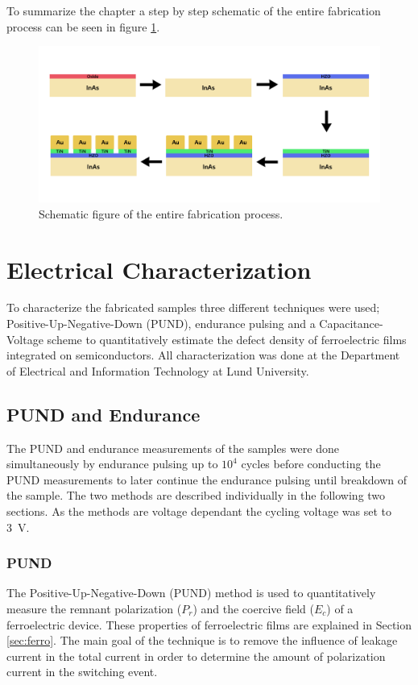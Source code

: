 \documentclass[11pt,twoside]{eitExjobb}
\begin{document}
To summarize the chapter a step by step schematic of the entire fabrication
process can be seen in figure \ref{fig:fab_done}.

\begin{figure}[htbp]
    \centering
    \includegraphics[width=.80\linewidth]{fig/fabproc/fab_done.png}
    \caption{Schematic figure of the entire fabrication process.}\label{fig:fab_done}
\end{figure}

\chapter{Electrical Characterization}\label{ch:char}

To characterize the fabricated samples three different techniques were used;
Positive-Up-Negative-Down (PUND), endurance pulsing and a Capacitance-Voltage scheme to
quantitatively estimate the defect density of ferroelectric films integrated on
semiconductors. \cite{persson2020method} All characterization was done at the
Department of Electrical and Information Technology at Lund University.

\section{PUND and Endurance}\label{sec:PandE}
The PUND and endurance measurements of the samples were done simultaneously by
endurance pulsing up to $10^4$ cycles before conducting the PUND measurements to
later continue the endurance pulsing until breakdown of the sample. The two
methods are described individually in the following two sections. As the
methods are voltage dependant the cycling voltage was set to \SI{3}{\volt}.

\subsection{PUND}\label{sec:PUND}
The Positive-Up-Negative-Down (PUND) method is used to quantitatively measure
the remnant polarization ($P_r$) and the coercive field ($E_c$) of a
ferroelectric device. These properties of ferroelectric films are explained in
Section \ref{sec:ferro}. The main goal of the technique is to remove the
influence of leakage current in the total current in order to determine the
amount of polarization current in the switching event.
\end{document}
